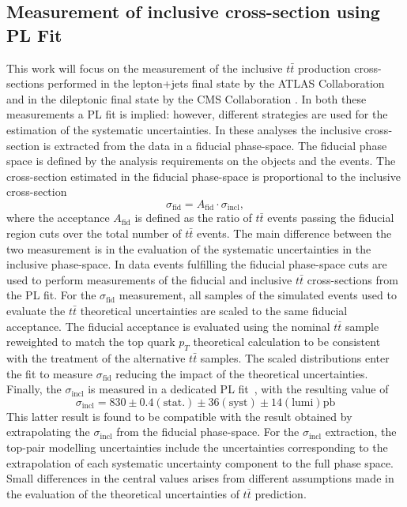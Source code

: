 \documentclass[12pt]{article}
\begin{document}
\subsection{Measurement of inclusive cross-section using PL Fit}
This work will focus on the measurement of the inclusive $t\bar{t}$ production cross-sections performed in the lepton+jets final state by the ATLAS Collaboration \cite{Aad_2020} and in the dileptonic final state by the CMS Collaboration \cite{CMS_inclusive}. In both these measurements a PL fit is implied: however, different strategies are used for the estimation of the systematic uncertainties. 
In these analyses the inclusive cross-section is extracted from the data in a fiducial phase-space. The fiducial phase space is defined by the analysis requirements on the objects and the events. The cross-section estimated in the fiducial phase-space is proportional to the inclusive cross-section
\begin{equation}
\sigma_{\mathrm{fid}} = A_{\mathrm{fid}} \cdot \sigma_{\mathrm{incl}}, 
\end{equation}
where the acceptance $A_{\mathrm{fid}}$ is defined as the ratio of $t\bar{t}$ events passing the fiducial region cuts over the total number of $t\bar{t}$ events.
The main difference between the two measurement is in the evaluation of the systematic uncertainties in the inclusive phase-space. 
In \cite{Aad_2020} data events fulfilling the fiducial phase-space cuts are used to perform measurements of the fiducial and inclusive $t\bar{t}$ cross-sections from the PL fit. For the $\sigma_{\mathrm{fid}}$ measurement, all samples of the simulated events used to evaluate the $t\bar{t}$ theoretical uncertainties are scaled to the same fiducial acceptance. 
The fiducial acceptance is evaluated using the nominal $t\bar{t}$ sample reweighted to match the top quark $p_T$ theoretical calculation to be consistent with the treatment of the alternative $t\bar{t}$ samples. The scaled distributions enter the fit to measure $\sigma_{\mathrm{fid}}$ reducing the impact of the theoretical uncertainties. 
Finally, the $\sigma_{\mathrm{incl}}$ is measured in a dedicated PL fit~\cite{Aad_2020}, with the resulting value of 
\begin{equation}
\sigma_{\mathrm{incl}} = 830\pm0.4(\mathrm{stat.})\pm36(\mathrm{syst})\pm14(\mathrm{lumi})\mathrm{pb}
\end{equation}
This latter result is found to be compatible with the result obtained by extrapolating the $\sigma_{\mathrm{incl}}$ from the fiducial phase-space. For the $\sigma_{\mathrm{incl}}$ extraction, the top-pair modelling uncertainties include the uncertainties corresponding to the extrapolation of each systematic uncertainty component to the full phase space. Small differences in the central values arises from different assumptions made in the evaluation of the theoretical uncertainties of $t\bar{t}$ prediction.
\end{document}
